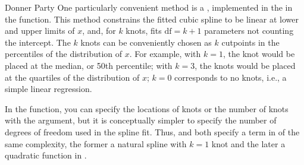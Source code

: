 \documentclass[11pt]{book}
\begin{document}
\begin{Example}[donner1]{Donner Party}
One particularly convenient method is a , implemented
in the  in the  function. This method constrains the
fitted cubic spline to be linear at lower and upper limits of $x$,
and, for $k$ knots, fits $\textrm{df} = k+1$ parameters not counting the intercept.
The $k$ knots can be conveniently chosen as $k$ cutpoints in the percentiles
of the distribution of $x$.  For example, with $k=1$, the knot would be placed
at the median, or 50th percentile; with $k=3$, the knots would be placed at the
quartiles of the distribution of $x$; $k=0$ corresponds to no knots, i.e.,
a simple linear regression.

In the  function, you can specify the locations of knots or the number of knots
with the  argument, but it is conceptually simpler to specify the 
number of degrees of freedom used in the spline fit. Thus, 
 and  both specify a term in  of the same
complexity, the former a natural spline with $k=1$ knot and the later
a quadratic function in .


\end{Example}
\end{document}
